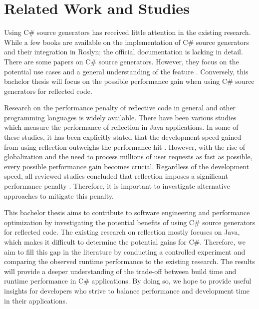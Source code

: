 \section{Related Work and Studies}

Using C\# source generators has received little attention in the existing research. While a few books \cite{Franz2022TrendsCompilerbau, Microsoft2022SourceGenerators, Vermeir2022.NETPlatform} are available on the implementation of C\# source generators and their integration in Roslyn; the official documentation \cite{Microsoft2022SourceGenerators} is lacking in detail. There are some papers on C\# source generators. However, they focus on the potential use cases and a general understanding of the feature \cite{Slimak2022SourceSLIMAK}. Conversely, this bachelor thesis will focus on the possible performance gain when using C\# source generators for reflected code.

Research on the performance penalty of reflective code in general and other programming languages is widely available. There have been various studies \cite{Forman2005EvaluatingPerformance, Halloway2001ReflectionInformIT, JavaReflection2013} which measure the performance of reflection in Java applications. In some of these studies, it has been explicitly stated that the development speed gained from using reflection outweighs the performance hit \cite{Halloway2001ReflectionInformIT}. However, with the rise of globalization and the need to process millions of user requests as fast as possible, every possible performance gain becomes crucial. Regardless of the development speed, all reviewed studies concluded that reflection imposes a significant performance penalty \cite{Forman2005EvaluatingPerformance, Halloway2001ReflectionInformIT, JavaReflection2013}. Therefore, it is important to investigate alternative approaches to mitigate this penalty.

This bachelor thesis aims to contribute to software engineering and performance optimization by investigating the potential benefits of using C\# source generators for reflected code. The existing research on reflection \cite{Forman2005EvaluatingPerformance, Halloway2001ReflectionInformIT, JavaReflection2013} mostly focuses on Java, which makes it difficult to determine the potential gains for C\#. Therefore, we aim to fill this gap in the literature by conducting a controlled experiment and comparing the observed runtime performance to the existing research. The results will provide a deeper understanding of the trade-off between build time and runtime performance in C\# applications. By doing so, we hope to provide useful insights for developers who strive to balance performance and development time in their applications.

